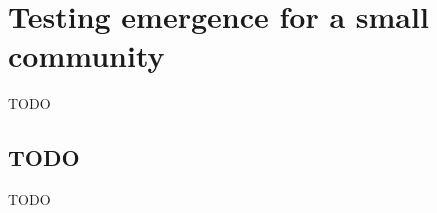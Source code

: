 \chapter{Testing emergence for a small community}
\label{ch:extension}

TODO


\section{TODO}
\label{sec:extension_todo}

TODO